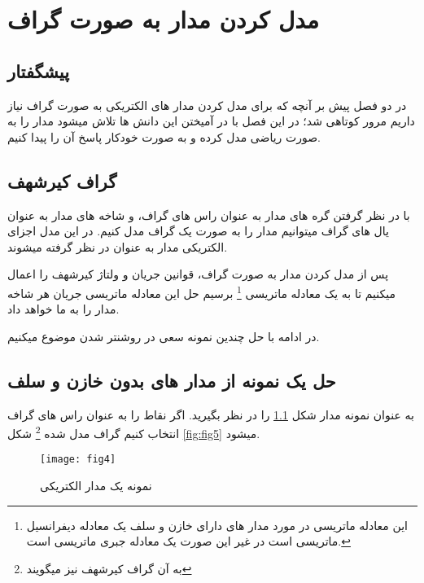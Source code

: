 \chapter{مدل کردن مدار به صورت گراف}
\label{chap:results}
\section{پیشگفتار} 
در دو فصل پیش بر آنچه که برای مدل کردن مدار های الکتریکی به صورت گراف نیاز داریم
مرور کوتاهی شد؛ در این فصل با در آمیختن این دانش ها تلاش میشود مدار را به صورت ریاضی مدل کرده
و به صورت خودکار پاسخ آن را پیدا کنیم.
\section{گراف کیرشهف}
با در نظر گرفتن گره های مدار به عنوان راس های گراف، و شاخه های مدار به عنوان یال های گراف
میتوانیم مدار را به صورت یک گراف مدل کنیم.
در این مدل اجزای الکتریکی مدار به عنوان 
در نظر گرفته میشوند.

پس از مدل کردن مدار به صورت گراف، قوانین جریان و ولتاژ کیرشهف را اعمال میکنیم تا به یک
معادله ماتریسی
\footnote{
	این معادله ماتریسی در مورد مدار های دارای خازن و سلف یک معادله دیفرانسیل ماتریسی است
	در غیر این صورت یک معادله جبری ماتریسی است.
}
برسیم حل این معادله ماتریسی جریان هر شاخه مدار را به ما خواهد داد.

در ادامه با حل چندین نمونه سعی در روشنتر شدن موضوع میکنیم.

\section{حل یک نمونه از مدار های بدون خازن و سلف}
به عنوان نمونه مدار شکل 
\ref{fig:fig4}
را در نظر بگیرید.
اگر نقاط
را به عنوان راس های گراف انتخاب کنیم گراف مدل شده
\footnote{
	به آن گراف کیرشهف نیز میگویند
}
شکل
\ref{fig:fig5}
 میشود.
\begin{figure}[ht]
	\centerline{\texttt{[image: fig4]}}
	\caption{نمونه یک مدار الکتریکی }
	\label{fig:fig4}
\end{figure}

